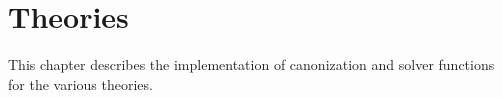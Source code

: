 
\newpage
\section*{Theories}

\ocwsection\label{theo}
This chapter describes the implementation of canonization and solver
functions for the various theories.

